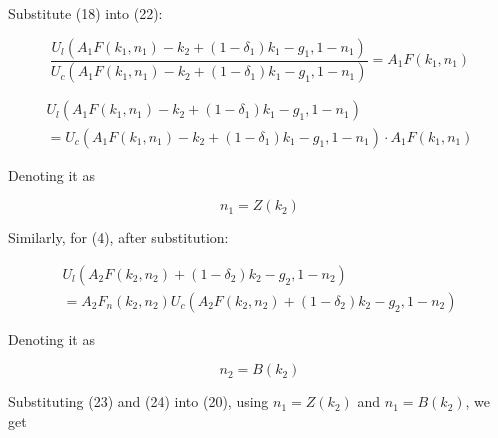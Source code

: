 \documentclass{article}
\begin{document}
Substitute (18) into (22):

\begin{equation*}
    \dfrac{U_{l}\left(A_{1}F\left(k_{1}, n_{1}\right)-k_{2}+\left(1-\delta_{1}\right)k_{1}-g_{1}, 1-n_{1}\right)}{U_{c}\left(A_{1}F\left(k_{1}, n_{1}\right)-k_{2}+\left(1-\delta_{1}\right)k_{1}-g_{1}, 1-n_{1}\right)}=A_{1}F\left(k_{1}, n_{1}\right)
\end{equation*}

\begin{multline}
    U_{l}\left(A_{1}F\left(k_{1}, n_{1}\right)-k_{2}+\left(1-\delta_{1}\right)k_{1}-g_{1}, 1-n_{1}\right)\\
    =U_{c}\left(A_{1}F\left(k_{1}, n_{1}\right)-k_{2}+\left(1-\delta_{1}\right)k_{1}-g_{1}, 1-n_{1}\right)\cdot A_{1}F\left(k_{1}, n_{1}\right)
\end{multline}

Denoting it as

\begin{equation*}
    n_{1}=Z\left(k_{2}\right)
\end{equation*}

Similarly, for (4), after substitution:

\begin{multline}
    U_{l}\left(A_{2}F\left(k_{2}, n_{2}\right)+\left(1-\delta_{2}\right)k_{2}-g_{2}, 1-n_{2}\right)\\
    =A_{2}F_{n}\left(k_{2}, n_{2}\right)U_{c}\left(A_{2}F\left(k_{2}, n_{2}\right)+\left(1-\delta_{2}\right)k_{2}-g_{2}, 1-n_{2}\right)
\end{multline}

Denoting it as

\begin{equation*}
    n_{2}=B\left(k_{2}\right)
\end{equation*}

Substituting (23) and (24) into (20), using $n_{1}=Z\left(k_{2}\right)$ and $n_{1}=B\left(k_{2}\right)$, we get

\end{document}
